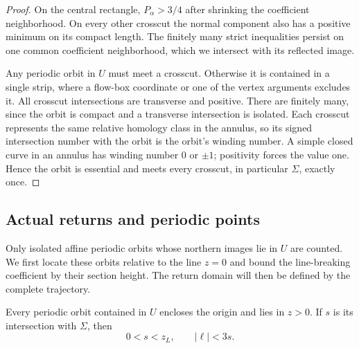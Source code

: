 \begin{proof}
On the central rectangle, $P_\alpha>3/4$ after shrinking the
coefficient neighborhood.  On every other crosscut the normal
component also has a positive minimum on its compact length.  The
finitely many strict inequalities persist on one common coefficient
neighborhood, which we intersect with its reflected image.

Any periodic orbit in $U$ must meet a crosscut.  Otherwise it is
contained in a single strip, where a flow-box coordinate or one of the
vertex arguments excludes it.  All crosscut intersections are transverse
and positive.  There are finitely many, since the orbit is compact and
a transverse intersection is isolated.  Each crosscut represents the
same relative homology class in the annulus, so its signed intersection
number with the orbit is the orbit's winding number.  A simple closed
curve in an annulus has winding number $0$ or $\pm1$; positivity
forces the value one.  Hence the orbit is essential and meets every
crosscut, in particular $\Sigma$, exactly once.
\end{proof}

\subsection{Actual returns and periodic points}

Only isolated affine periodic orbits whose northern images lie in $U$
are counted.  We first locate these orbits relative to the line $z=0$
and bound the line-breaking coefficient by their section height.  The
return domain will then be defined by the complete trajectory.

\begin{lemma}\label{rw:geometry:cycle-height}
Every periodic orbit contained in $U$ encloses the origin and lies in
$z>0$.  If $s$ is its intersection with $\Sigma$, then
\begin{equation}\label{rw:geometry:line-bound}
 0<s<z_L,\qquad |\ell|<3s.
\end{equation}
\end{lemma}

